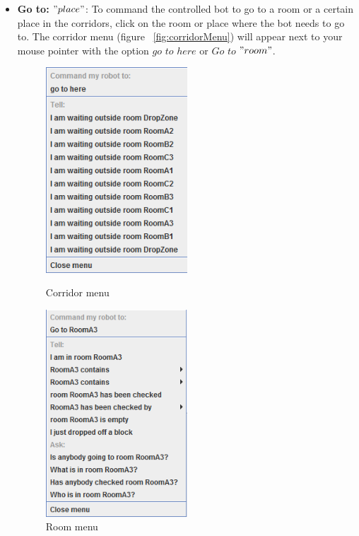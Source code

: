 \begin{itemize}

\item \textbf{Go to: $"place"$}:
To command the controlled bot to go to a room or a certain place in the corridors, click on the room or place where the bot needs to go to. The corridor menu (figure ~\ref{fig:corridorMenu}) will appear next to your mouse pointer with the option $go$ $to$ $here$ or $Go$ $to$ $"room"$.\\

\begin{figure}[h]
\centering
\begin{minipage}{0.48\textwidth}
	\centering
	\includegraphics[width=0.5\textwidth]{HumanPlayerGUI/hpg-corridor-menu.png}
	\caption{Corridor menu}
	\label{fig:corridorMenu}
\end{minipage}\hfill
\begin{minipage}{0.48\textwidth}
	\centering
	\includegraphics[width=0.5\textwidth]{HumanPlayerGUI/hpg-room-menu.png}
	\caption{Room menu}
	\label{fig:roomMenu}
\end{minipage}
\end{figure}



\end{itemize}
